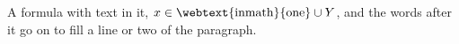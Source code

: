 A formula with text in it, $x \in \text{\webtext{inmath}{one}} \cup Y$, and
the words after it go on to fill a line or two of the paragraph.
